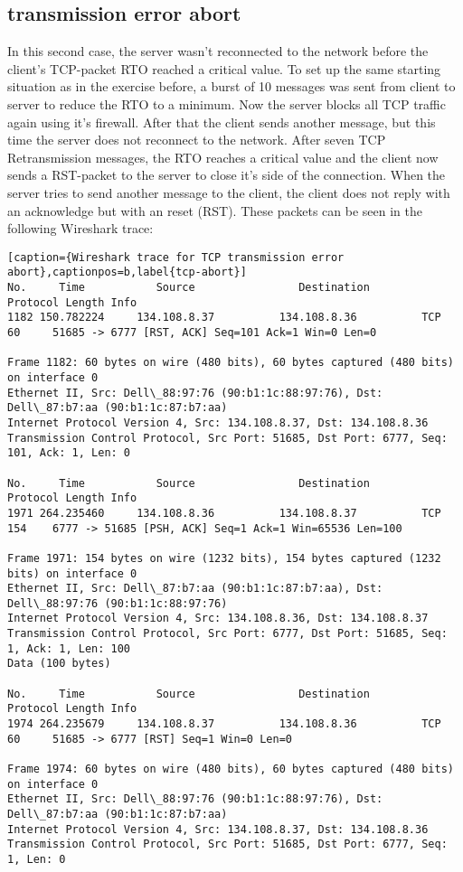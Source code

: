 \subsection{transmission error abort}
In this second case, the server wasn't reconnected to the network before the client's TCP-packet RTO reached a critical value. To set up the same starting situation as in the exercise before, a burst of 10 messages was sent from client to server to reduce the RTO to a minimum. Now the server blocks all TCP traffic again using it's firewall. After that the client sends another message, but this time the server does not reconnect to the network. After seven TCP Retransmission messages, the RTO reaches a critical value and the client now sends a RST-packet to the server to close it's side of the connection. When the server tries to send another message to the client, the client does not reply with an acknowledge but with an reset (RST). These packets can be seen in the following Wireshark trace:
\\
\begin{lstlisting}[caption={Wireshark trace for TCP transmission error abort},captionpos=b,label{tcp-abort}]
No.     Time           Source                Destination           Protocol Length Info
1182 150.782224     134.108.8.37          134.108.8.36          TCP      60     51685 -> 6777 [RST, ACK] Seq=101 Ack=1 Win=0 Len=0

Frame 1182: 60 bytes on wire (480 bits), 60 bytes captured (480 bits) on interface 0
Ethernet II, Src: Dell\_88:97:76 (90:b1:1c:88:97:76), Dst: Dell\_87:b7:aa (90:b1:1c:87:b7:aa)
Internet Protocol Version 4, Src: 134.108.8.37, Dst: 134.108.8.36
Transmission Control Protocol, Src Port: 51685, Dst Port: 6777, Seq: 101, Ack: 1, Len: 0

No.     Time           Source                Destination           Protocol Length Info
1971 264.235460     134.108.8.36          134.108.8.37          TCP      154    6777 -> 51685 [PSH, ACK] Seq=1 Ack=1 Win=65536 Len=100

Frame 1971: 154 bytes on wire (1232 bits), 154 bytes captured (1232 bits) on interface 0
Ethernet II, Src: Dell\_87:b7:aa (90:b1:1c:87:b7:aa), Dst: Dell\_88:97:76 (90:b1:1c:88:97:76)
Internet Protocol Version 4, Src: 134.108.8.36, Dst: 134.108.8.37
Transmission Control Protocol, Src Port: 6777, Dst Port: 51685, Seq: 1, Ack: 1, Len: 100
Data (100 bytes)

No.     Time           Source                Destination           Protocol Length Info
1974 264.235679     134.108.8.37          134.108.8.36          TCP      60     51685 -> 6777 [RST] Seq=1 Win=0 Len=0

Frame 1974: 60 bytes on wire (480 bits), 60 bytes captured (480 bits) on interface 0
Ethernet II, Src: Dell\_88:97:76 (90:b1:1c:88:97:76), Dst: Dell\_87:b7:aa (90:b1:1c:87:b7:aa)
Internet Protocol Version 4, Src: 134.108.8.37, Dst: 134.108.8.36
Transmission Control Protocol, Src Port: 51685, Dst Port: 6777, Seq: 1, Len: 0

\end{lstlisting}
